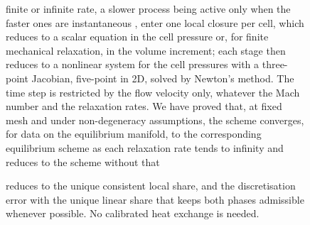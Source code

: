 \begin{figure}[p]
{%
finite or infinite rate, a slower process being active only when the faster ones are instantaneous \cite{Pelanti2022}, enter one local closure per cell, which reduces to a scalar equation in the
cell pressure or, for finite mechanical relaxation, in the volume increment; each stage then reduces to a nonlinear system
for the cell pressures with a three-point Jacobian, five-point in 2D, solved by Newton's method. The time step is restricted by the flow velocity only, whatever
the Mach number and the relaxation rates. We have proved that, at fixed mesh and under non-degeneracy assumptions, the scheme converges, for data on the
equilibrium manifold, to the corresponding equilibrium scheme as each relaxation rate tends to infinity and reduces to the scheme without that

reduces to the unique consistent local share, and the discretisation error with the unique linear share that keeps both phases
admissible whenever possible. No calibrated heat exchange is needed.

}
\end{figure}
